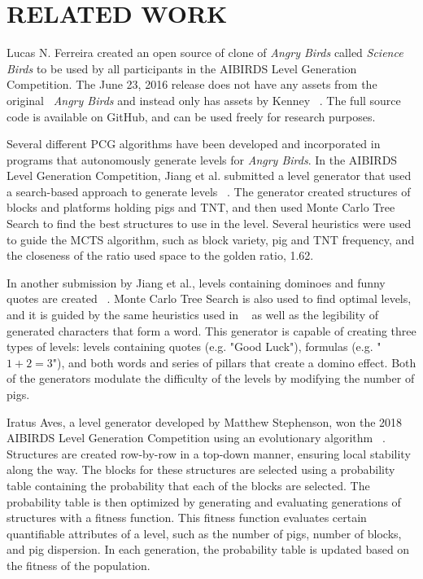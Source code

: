 \documentclass[letterpaper, 10 pt, conference]{ieeeconf}
\begin{document}
\section{RELATED WORK}

Lucas N. Ferreira created an open source of clone of \textit{Angry Birds} called \textit{Science Birds} to be used by all participants in the AIBIRDS Level Generation Competition. The June 23, 2016 release does not have any assets from the original ~\textit{Angry Birds} and instead only has assets by Kenney ~\cite{kenney}. The full source code is available on GitHub, and can be used freely for research purposes.
\par
Several different PCG algorithms have been developed and incorporated in programs that autonomously generate levels for \textit{Angry Birds}. In the AIBIRDS Level Generation Competition, Jiang et al. submitted a level generator that used a search-based approach to generate levels ~\cite{jiang2017mcts}. The generator created structures of blocks and platforms holding pigs and TNT, and then used Monte Carlo Tree Search to find the best structures to use in the level. Several heuristics were used to guide the MCTS algorithm, such as block variety, pig and TNT frequency, and the closeness of the ratio used space to the golden ratio, 1.62.
\par
In another submission by Jiang et al., levels containing dominoes and funny quotes are created ~\cite{jiang2017funny}. Monte Carlo Tree Search is also used to find optimal levels, and it is guided by the same heuristics used in ~\cite{jiang2017mcts} as well as the legibility of generated characters that form a word. This generator is capable of creating three types of levels: levels containing quotes (e.g. "Good Luck"), formulas (e.g. "$1 + 2 = 3$"), and both words and series of pillars that create a domino effect. Both of the generators modulate the difficulty of the levels by modifying the number of pigs.
\par
Iratus Aves, a level generator developed by Matthew Stephenson, won the 2018 AIBIRDS Level Generation Competition using an evolutionary algorithm ~\cite{renz2017generating}. Structures are created row-by-row in a top-down manner, ensuring local stability along the way. The blocks for these structures are selected using a probability table containing the probability that each of the blocks are selected. The probability table is then optimized by generating and evaluating generations of structures with a fitness function. This fitness function evaluates certain quantifiable attributes of a level, such as the number of pigs, number of blocks, and pig dispersion. In each generation, the probability table is updated based on the fitness of the population.
\end{document}
